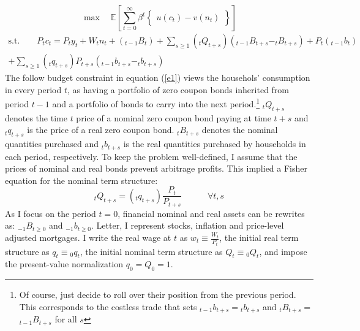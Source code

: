\documentclass[11pt,letterpaper]{article}
\begin{document}
{%
\begin{equation*}
	\max \quad \mathbb{E} \left[\sum_{t=0}^{\infty}\beta^{t}\begin{Bmatrix}u (c_{t}) - v(n_{t})\end{Bmatrix}\right]
\end{equation*}
\begin{equation}\begin{split}\label{e1}
		\text{s.t.} \quad \quad P_{t}c_{t} = P_{t}y_{t} + W_{t}n_{t} + (_{t-1}B_{t}) + \sum_{s \geqslant 1}(_{t}Q_{t+s})(_{t-1}B_{t+s} - _{t}B_{t+s}) + P_{t}(_{t-1}b_{t}) \\
		+ \sum_{s \geqslant 1}(_{t}q_{t+s}) P_{t+s} (_{t-1}b_{t+s} - _{t}b_{t+s})
\end{split}\end{equation}
The follow budget constraint in equation (\ref{e1}) views the househols' consumption in every period $t$, as having a portfolio of zero coupon bonds inherited from period $t-1$ and a portfolio of bonds to carry into the next period.\footnote{Of course, just decide to roll over their position from the previous period. This corresponds to the costless trade that sets $_{t-1}b_{t+s} $$= $$_{t}b_{t+s}$ and $_{t}B_{t+s}$$=$$ _{t-1}B_{t+s}$ for all $s$} $_tQ_{t+s}$ denotes the time $t$ price of a nominal zero coupon bond paying at time $t+s$ and $_{t}q_{t+s}$ is the price of a real zero coupon bond. $_{t}B_{t+s}$ denotes the nominal quantities purchased and $_{t}b_{t+s}$ is the real quantities purchased by households in each period, respectively. To keep the problem well-defined, I assume that the prices of nominal and real bonds prevent arbitrage profits. This implied a Fisher equation for the nominal term structure: 
\begin{equation*}
	_{t}Q_{t+s} = (_{t}q_{t+s}) \frac{P_{t}}{P_{t+s}} \quad \quad \quad \forall t,s
\end{equation*}
As I focus on the period $t=0$, financial nominal and real assets can be rewrites as: $_{-1}B_{t\geq 0}$ and $_{-1}b_{t\geq 0}$. Letter, I represent stocks, inflation and price-level adjusted mortgages. I write the real wage at $t$ as $w_{t} \equiv \frac{W_{t}}{P_{t}}$, the initial real term structure as $q_{t} \equiv {_{0}q_{t}}$, the initial nominal term structure as $Q_{t} \equiv {_{0}Q_{t}}$, and impose the present-value normalization $q_{0} = Q_{0} =1$.

}
\end{document}
